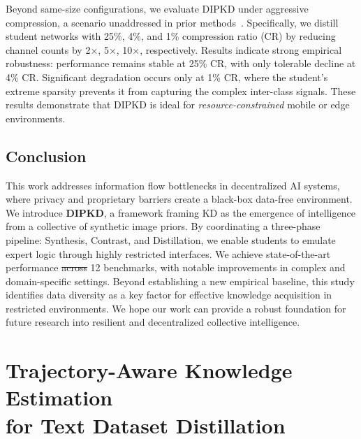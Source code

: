\documentclass[12pt, a4paper, twoside]{book}
\makeatletter
\numberwithin{equation}{chapter}
\theoremstyle{plain}
\theoremstyle{definition}
\theoremstyle{remark}
\newenvironment{foldable}{}{}
\providecommand{\DIFaddtex}[1]{{\protect\color{blue}\uwave{#1}}} %
\providecommand{\DIFdeltex}[1]{{\protect\color{red}\sout{#1}}} %
\providecommand{\DIFaddbegin}{} %
\providecommand{\DIFaddend}{} %
\providecommand{\DIFdelbegin}{} %
\providecommand{\DIFdelend}{} %
\providecommand{\DIFadd}[1]{\texorpdfstring{\DIFaddtex{#1}}{#1}} %
\providecommand{\DIFdel}[1]{\texorpdfstring{\DIFdeltex{#1}}{}} %
\newcommand{\DIFscaledelfig}{0.5}
\newlength{\DIFdelgraphicswidth} %
\newlength{\DIFdelgraphicsheight} %
\newcommand{\DIFaddincludegraphics}[2][]{{\color{blue}\fbox{\DIFOincludegraphics[#1]{#2}}}} %
\newcommand{\DIFdelincludegraphics}[2][]{%
\sbox{\DIFdelgraphicsbox}{\DIFOincludegraphics[#1]{#2}}%
\settoboxwidth{\DIFdelgraphicswidth}{\DIFdelgraphicsbox} %
\settoboxtotalheight{\DIFdelgraphicsheight}{\DIFdelgraphicsbox} %
\scalebox{\DIFscaledelfig}{%
\parbox[b]{\DIFdelgraphicswidth}{\usebox{\DIFdelgraphicsbox}\\[-\baselineskip] \rule{\DIFdelgraphicswidth}{0em}}\llap{\resizebox{\DIFdelgraphicswidth}{\DIFdelgraphicsheight}{%
\setlength{\unitlength}{\DIFdelgraphicswidth}%
\begin{picture}(1,1)%
\thicklines\linethickness{2pt} %
{\color[rgb]{1,0,0}\put(0,0){\framebox(1,1){}}}%
{\color[rgb]{1,0,0}\put(0,0){\line( 1,1){1}}}%
{\color[rgb]{1,0,0}\put(0,1){\line(1,-1){1}}}%
\end{picture}%
}\hspace*{3pt}}} %
} %
\DeclareRobustCommand{\DIFaddbegin}{\DIFOaddbegin \let\includegraphics\DIFaddincludegraphics} %
\DeclareRobustCommand{\DIFaddend}{\DIFOaddend \let\includegraphics\DIFOincludegraphics} %
\DeclareRobustCommand{\DIFdelbegin}{\DIFOdelbegin \let\includegraphics\DIFdelincludegraphics} %
\DeclareRobustCommand{\DIFdelend}{\DIFOaddend \let\includegraphics\DIFOincludegraphics} %
\let\sout@orig\sout %
\renewcommand{\sout}[1]{\ifmmode\text{\sout@orig{\ensuremath{#1}}}\else\sout@orig{#1}\fi} %
\makeatother
\begin{document}
\begin{foldable}
  Beyond same-size configurations, we evaluate DIPKD under aggressive compression, a scenario unaddressed in prior methods~\cite{wang2021zero,zhang2022ideal,yuan2024data}.
  Specifically, we distill student networks with 25\%, 4\%, and 1\% compression ratio (CR) by reducing channel counts by 2$\times$, 5$\times$, 10$\times$, respectively.
  Results indicate strong empirical robustness: performance remains stable at 25\% CR, with only tolerable decline at 4\% CR.
  Significant degradation occurs only at 1\% CR, where the student's extreme sparsity prevents it from capturing the complex inter-class signals.
  These results demonstrate that DIPKD is ideal for \textit{resource-constrained} mobile or edge environments.
\end{foldable}
 \section{Conclusion} \label{sec:45-research02-conclusion}

\begin{foldable}
  This work addresses information flow bottlenecks in decentralized \ac{AI} systems, where privacy and proprietary barriers create a black-box data-free environment.
  We introduce \textbf{DIPKD}, a framework framing \ac{KD} as the emergence of intelligence from a collective of synthetic image priors.
  By coordinating a three-phase pipeline: Synthesis, Contrast, and Distillation, we enable students to emulate expert logic through highly restricted interfaces.
  We achieve state-of-the-art performance \DIFdelbegin \DIFdel{across }\DIFdelend \DIFaddbegin \DIFadd{on 11 of }\DIFaddend 12 benchmarks, with notable improvements in complex and domain-specific settings.
  Beyond establishing a new empirical baseline, this study identifies data diversity as a key factor for effective knowledge acquisition in restricted environments.
  We hope our work can provide a robust foundation for future research into resilient and decentralized collective intelligence.
\end{foldable}
 \clearpage{}
\clearpage{}\acresetall

\chapter[Trajectory-Aware Knowledge Estimation for Text Dataset Distillation]{Trajectory-Aware Knowledge Estimation \\ for Text Dataset Distillation} \label{ch:50-research03}
\end{document}

